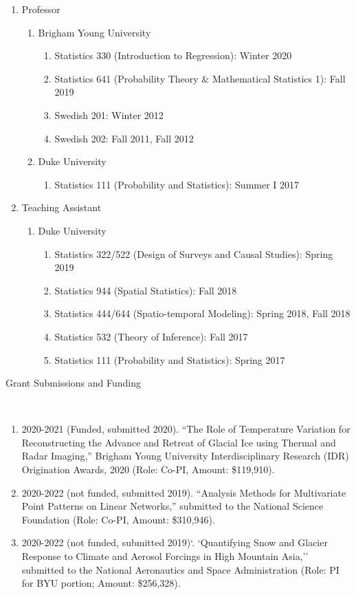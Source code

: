 \documentclass[12pt]{article}
\newcommand{\head}[1]{ %
    \bigskip %
    \begin{large}\begin{bf}{#1}\end{bf}\end{large} %

    \ \\ [-1.3cm] %

    \hrulefill}
\begin{document}
\begin{enumerate}[label=$\bullet$]
\item Professor
\begin{enumerate}[label=$\cdot$]
\item Brigham Young University
\begin{enumerate}[label=$\cdot$]
\item Statistics 330 (Introduction to Regression): Winter 2020
\item Statistics 641 (Probability Theory \& Mathematical Statistics 1): Fall 2019
\item Swedish 201: Winter 2012 
\item Swedish 202: Fall 2011, Fall 2012
\end{enumerate}
\item Duke University
\begin{enumerate}[label=$\cdot$]
\item Statistics 111 (Probability and Statistics): Summer I 2017
\end{enumerate}
\end{enumerate}
\item Teaching Assistant
\begin{enumerate}[label=$\cdot$]
\item Duke University
\begin{enumerate}[label=$\cdot$]
\item Statistics 322/522 (Design of Surveys and Causal Studies): Spring 2019
\item Statistics 944 (Spatial Statistics): Fall 2018
\item Statistics 444/644 (Spatio-temporal Modeling): Spring 2018, Fall 2018
\item Statistics 532 (Theory of Inference): Fall 2017
\item Statistics 111 (Probability and Statistics): Spring 2017 
\end{enumerate}
\end{enumerate}
\end{enumerate}

\head{Grant Submissions and Funding}


\begin{enumerate}[label=$\bullet$]
\item 2020-2021 (Funded, submitted 2020). ``The Role of Temperature Variation for Reconstructing the Advance and Retreat of Glacial Ice using Thermal and Radar Imaging,'' Brigham Young University Interdisciplinary Research (IDR) Origination Awards, 2020 (Role: Co-PI, Amount: \$119,910).
\item 2020-2022 (not funded, submitted 2019). ``Analysis Methods for Multivariate Point Patterns on Linear Networks,'' submitted to the National Science Foundation (Role: Co-PI, Amount: \$310,946).
\item 2020-2022 (not funded, submitted 2019)`. `Quantifying Snow and Glacier Response to Climate and Aerosol Forcings in High Mountain Asia,'' submitted to the National Aeronautics and Space Administration (Role: PI for BYU portion; Amount: \$256,328).
\end{enumerate}
\end{document}
